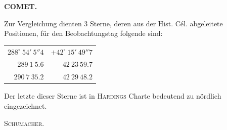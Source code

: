 \clearpage
\noindent{}%
\makebox[12mm][l]{}%
\parbox[t]{\dimexpr\linewidth-24mm\relax}{\centering\footnotesize\bfseries COMET.\par}%
\par\nobreak\medskip
Zur Vergleichung dienten 3 Sterne, deren aus der Hist. Cél. abgeleitete Positionen, für den Beobachtungstag folgende sind:

\begin{center}
\begin{tabular}{rr}
$288^\circ\ 54'\ 5''4$ & $+42^\circ\ 15'\ 49''7$ \\
$289\ 1\ 5.6$ & $42\ 23\ 59.7$ \\
$290\ 7\ 35.2$ & $42\ 29\ 48.2$ \\
\end{tabular}
\end{center}

Der letzte dieser Sterne ist in \textsc{Hardings} Charte bedeutend zu nördlich eingezeichnet.
\begin{flushright}\textsc{Schumacher}.\end{flushright}

